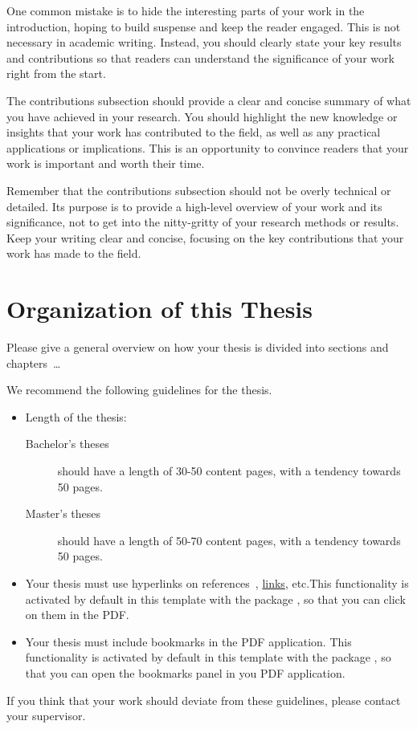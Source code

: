 One common mistake is to hide the interesting parts of your work in the introduction, hoping to build suspense and keep the reader engaged. This is not necessary in academic writing. Instead, you should clearly state your key results and contributions so that readers can understand the significance of your work right from the start.

The contributions subsection should provide a clear and concise summary of what you have achieved in your research. You should highlight the new knowledge or insights that your work has contributed to the field, as well as any practical applications or implications. This is an opportunity to convince readers that your work is important and worth their time.

Remember that the contributions subsection should not be overly technical or detailed. Its purpose is to provide a high-level overview of your work and its significance, not to get into the nitty-gritty of your research methods or results. Keep your writing clear and concise, focusing on the key contributions that your work has made to the field.

\section{Organization of this Thesis}
Please give a general overview on how your thesis is divided into sections and chapters~\dots

We recommend the following guidelines for the thesis.

\begin{itemize}
    \item Length of the thesis:
    \begin{description}
        \item[Bachelor's theses] should have a length of 30-50 content pages, with a tendency towards 50 pages.
        \item[Master's theses] should have a length of 50-70 content pages, with a tendency towards 50 pages.
    \end{description}
    \item Your thesis must use hyperlinks on references~\cite{AviramSSHDSVAHD16}, \href{https://example.com}{links}, etc.This functionality is activated by default in this template with the package , so that you can click on them in the PDF.
    \item Your thesis must include bookmarks in the PDF application. This functionality is activated by default in this template with the package , so that you can open the bookmarks panel in you PDF application.
\end{itemize}

If you think that your work should deviate from these guidelines, please contact your supervisor.